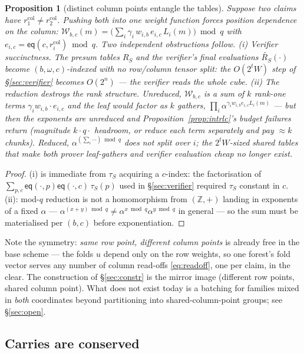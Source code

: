 \documentclass[11pt]{article}
\newcommand{\Z}{\mathbb{Z}}
\newcommand{\mle}[1]{\widetilde{#1}}
\newcommand{\eq}{\mathsf{eq}}
\newcommand{\Wc}{\mathcal{W}}          %
\theoremstyle{plain}
\newtheorem{proposition}[theorem]{Proposition}
\theoremstyle{definition}
\theoremstyle{remark}
\begin{document}
\begin{proposition}[distinct column points entangle the tables]\label{prop:mixed}
Suppose two claims have $r^{\mathrm{col}}_1\ne r^{\mathrm{col}}_2$. Pushing
both into one weight function forces position dependence on the column:
$\Wc_{b,c}(m) = \bigl(\sum_i\gamma_i\,w_{i,b}\,e_{i,c}\,L_i(m)\bigr)\bmod q$
with $e_{i,c}=\eq(c,r_i^{\mathrm{col}})\bmod q$. Two independent obstructions
follow.
\emph{(i) Verifier succinctness.} The presum tables $R_S$ and the verifier's
final evaluations $\mle{R_S}(\cdot)$ become $(b,\omega,c)$-indexed with no
row/column tensor split: the $O(2^{t}W)$ step of \S\ref{sec:verifier}
becomes $O(2^{n})$ --- the verifier reads the whole cube.
\emph{(ii) The reduction destroys the rank structure.} Unreduced,
$\Wc_{b,c}$ is a sum of $k$ rank-one terms $\gamma_iw_{i,b}\cdot e_{i,c}$ and
the leaf would factor as $k$ gathers,
$\prod_i\alpha^{\gamma_iw_{i,b}e_{i,c}L_i(m)}$ --- but then the exponents are
unreduced and Proposition~\ref{prop:intrlc}'s budget failures return
(magnitude $k\cdot q\cdot$ headroom, or reduce each term separately and pay
$\approx k$ chunks). Reduced, $\alpha^{(\sum_i\cdots)\bmod q}$ does not split
over $i$; the $2^{t}W$-sized shared tables that make both prover leaf-gathers
and verifier evaluation cheap no longer exist.
\end{proposition}

\begin{proof}
(i) is immediate from $\tau_S$ acquiring a $c$-index: the factorisation of
$\sum_{p,c}\eq(\cdot,p)\eq(\cdot,c)\,\tau_S(p)$ used in \S\ref{sec:verifier}
required $\tau_S$ constant in $c$. (ii): mod-$q$ reduction is not a
homomorphism from $(\Z,+)$ landing in exponents of a fixed $\alpha$ ---
$\alpha^{(x+y)\bmod q}\ne\alpha^{x\bmod q}\alpha^{y\bmod q}$ in general ---
so the sum must be materialised per $(b,c)$ before exponentiation.
\end{proof}

Note the symmetry: \emph{same row point, different column points} is already
free in the base scheme --- the folds $u$ depend only on the row weights, so
one forest's fold vector serves any number of column read-offs
\eqref{eq:readoff}, one per claim, in the clear. The construction of
\S\ref{sec:constr} is the mirror image (different row points, shared column
point). What does not exist today is a batching for families mixed in
\emph{both} coordinates beyond partitioning into shared-column-point groups;
see \S\ref{sec:open}.

\subsection{Carries are conserved}\label{sec:carries}
\end{document}
